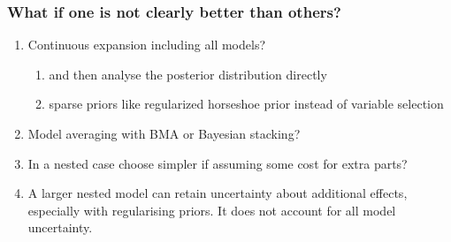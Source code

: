 \documentclass[10pt]{beamer}
\begin{document}
\begin{frame}{}

\frametitle{What if one is not clearly better than others?}

  \begin{enumerate}
  \item<2-> Continuous expansion including all models?
    \begin{enumerate}
    \item and then analyse the posterior distribution directly
      \item sparse priors like regularized horseshoe prior instead of variable selection
    \end{enumerate}
  \item<3-> Model averaging with BMA or Bayesian stacking?
  \item<4-> In a nested case choose simpler if assuming some cost for
    extra parts?
  \item<5-> A larger nested model can retain uncertainty about additional effects,
    especially with regularising priors. It does not account for all model uncertainty.%
  \end{enumerate}

\end{frame}
\end{document}
